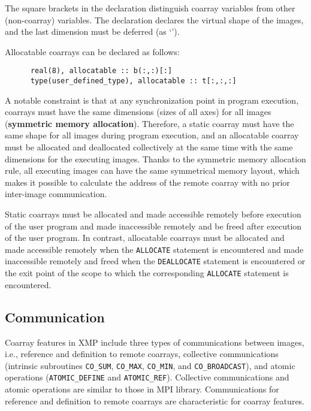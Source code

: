 The square brackets in the declaration distinguish coarray variables from 
other (non-coarray) variables. The declaration declares the virtual shape of the images, 
and the last dimension must be deferred (as `{\tt *}').

Allocatable coarrays can be declared as follows:
\begin{verbatim}
      real(8), allocatable :: b(:,:)[:]
      type(user_defined_type), allocatable :: t[:,:,:]
\end{verbatim}


A notable constraint is that at any synchronization point in program execution, 
coarrays must have the same dimensions (sizes of all axes) for all images
({\bf symmetric memory allocation}). 
Therefore, a static coarray must have the same shape for all images during 
program execution, and an allocatable coarray must be allocated and deallocated 
collectively at the same time with the same dimensions for the executing images.
Thanks to the symmetric memory allocation rule, all executing images can have
the same symmetrical memory layout, which makes it possible to calculate the address 
of the remote coarray with no prior inter-image communication.

\requirement
Static coarrays must be allocated and made accessible remotely
before execution of the user program and 
made inaccessible remotely and be freed after execution of the user program.
In contrast, allocatable coarrays must be allocated and made accessible remotely
when the {\tt ALLOCATE} statement is encountered and 
made inaccessible remotely and freed when the {\tt DEALLOCATE} statement is encountered or 
the exit point of the scope to which the corresponding {\tt ALLOCATE} statement is encountered.


\subsection{Communication}\label{sec:spec-comm}

Coarray features in XMP include three types of communications between images, i.e.,
reference and definition to remote coarrays,
collective communications (intrinsic subroutines {\tt CO\_SUM}, {\tt CO\_MAX}, 
{\tt CO\_MIN}, and {\tt CO\_BROADCAST}), and
atomic operations ({\tt ATOMIC\_DEFINE} and {\tt ATOMIC\_REF}).
%
Collective communications and atomic operations are similar to those
in MPI library.
Communications for reference and definition to remote coarrays are 
characteristic for coarray features.


